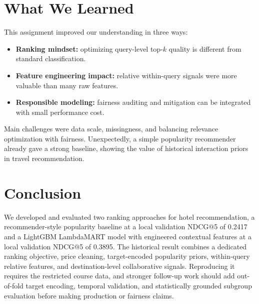 \documentclass{llncs}
\begin{document}
\section{What We Learned}
\label{sec:learned}

This assignment improved our understanding in three ways:
\begin{itemize}
\item \textbf{Ranking mindset:} optimizing query-level top-$k$ quality is different from standard classification.
\item \textbf{Feature engineering impact:} relative within-query signals were more valuable than many raw features.
\item \textbf{Responsible modeling:} fairness auditing and mitigation can be integrated with small performance cost.
\end{itemize}

Main challenges were data scale, missingness, and balancing relevance optimization with fairness. Unexpectedly, a simple popularity recommender already gave a strong baseline, showing the value of historical interaction priors in travel recommendation.

\section{Conclusion}
\label{sec:conclusion}

We developed and evaluated two ranking approaches for hotel recommendation, a recommender-style popularity baseline at a local validation NDCG@5 of 0.2417 and a LightGBM LambdaMART model with engineered contextual features at a local validation NDCG@5 of 0.3895. The historical result combines a dedicated ranking objective, price cleaning, target-encoded popularity priors, within-query relative features, and destination-level collaborative signals. Reproducing it requires the restricted course data, and stronger follow-up work should add out-of-fold target encoding, temporal validation, and statistically grounded subgroup evaluation before making production or fairness claims.
\end{document}
